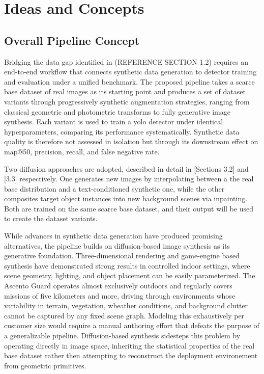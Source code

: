 \chapter{Ideas and Concepts}

\section{Overall Pipeline Concept}
Bridging the data gap identified in (REFERENCE SECTION 1.2) requires an end-to-end workflow that connects 
synthetic data generation to detector training and evaluation under a unified benchmark. The proposed pipeline 
takes a scarce base dataset of real images as its starting point and produces a set of dataset variants through 
progressively synthetic augmentation strategies, ranging from classical geometric and photometric transforms to fully
 generative image synthesis.
 Each variant is used to train a \gls{yolo} detector under identical hyperparameters, comparing its performance systematically. 
Synthetic data quality is therefore not assessed in isolation but through its downstream effect on \gls{map@50}, precision, recall, and false negative rate. 

Two diffusion approaches are adopted, described in detail in [Sections 3.2] and [3.3] respectively. One generates new images by interpolating between a the real 
base distribution and a text-conditioned synthetic one, while the other composites target object instances into new background scenes via inpainting. Both are 
trained on the same scarce base dataset, and their output will be used to create the dataset variants.

While advances in synthetic data generation have produced promising alternatives, the pipeline builds on diffusion-based image synthesis as its generative foundation. 
Three-dimensional rendering and game-engine based synthesis have demonstrated strong results in controlled indoor settings, where scene geometry, lighting, 
and object placement can be easily parameterized. The Ascento Guard operates almost exclusively outdoors and regularly covers missions of five kilometers and more, driving 
through environments whose variability in terrain, vegetation, wheather conditions, and background clutter cannot be captured by any fixed scene graph. Modeling this exhaustively 
per customer size would require a manual authoring effort that defeats the purpose of a generalizable pipeline. Diffusion-based synthesis sidesteps this problem by operating 
directly in image space, inheriting the statistical properties of the real base dataset rather then attempting to reconstruct the deployment environement from geometric primitives. 

